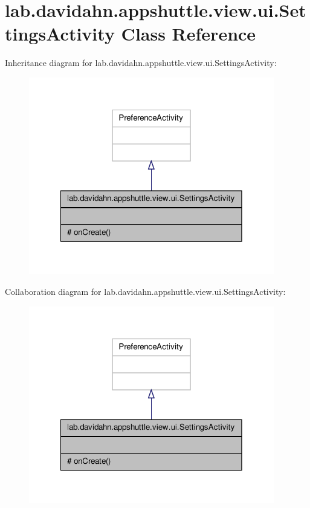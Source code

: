 \hypertarget{classlab_1_1davidahn_1_1appshuttle_1_1view_1_1ui_1_1_settings_activity}{\section{lab.\-davidahn.\-appshuttle.\-view.\-ui.\-Settings\-Activity \-Class \-Reference}
\label{classlab_1_1davidahn_1_1appshuttle_1_1view_1_1ui_1_1_settings_activity}
}


\-Inheritance diagram for lab.\-davidahn.\-appshuttle.\-view.\-ui.\-Settings\-Activity\-:
\nopagebreak
\begin{figure}[H]
\begin{center}
\leavevmode
\includegraphics[width=304pt]{classlab_1_1davidahn_1_1appshuttle_1_1view_1_1ui_1_1_settings_activity__inherit__graph}
\end{center}
\end{figure}


\-Collaboration diagram for lab.\-davidahn.\-appshuttle.\-view.\-ui.\-Settings\-Activity\-:
\nopagebreak
\begin{figure}[H]
\begin{center}
\leavevmode
\includegraphics[width=304pt]{classlab_1_1davidahn_1_1appshuttle_1_1view_1_1ui_1_1_settings_activity__coll__graph}
\end{center}
\end{figure}
